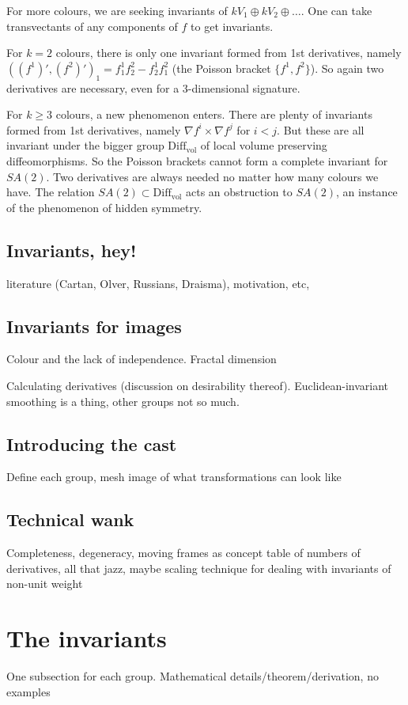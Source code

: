 \documentclass{article}
\begin{document}
For more colours,  we are seeking invariants of $k V_1 \oplus k V_2 \oplus \dots$. One can take transvectants of any components of $f$ to get invariants.

For $k=2$ colours, there is only one  invariant formed from 1st derivatives, namely $((f^1)',(f^2)')_1 = f^1_1 f^2_2 - f^1_2 f^2_1$ (the Poisson bracket $\{f^1,f^2\}$). So again two derivatives are necessary, even for 
a 3-dimensional signature.

 For $k\ge 3$ colours, a new phenomenon enters.  There are plenty of invariants
formed from 1st derivatives, namely $\nabla f^i \times \nabla f^j$ for $i<j$. But these are all invariant under the bigger group $\mathrm{Diff}_{\mathrm{vol}}$ of local volume preserving diffeomorphisms. So the Poisson brackets
cannot form a complete invariant for $SA(2)$. Two derivatives are always needed no matter how many
colours we have. The relation $SA(2)\subset \mathrm{Diff}_{\mathrm{vol}}$ acts an obstruction
to $SA(2)$, an instance of the phenomenon of hidden symmetry.


\subsection{Invariants, hey!}
literature (Cartan, Olver, Russians, Draisma), motivation, etc,

\subsection{Invariants for images}
Colour and the lack of independence. Fractal dimension 

Calculating derivatives (discussion on desirability thereof).
Euclidean-invariant smoothing is a thing, other groups not so much.

\subsection{Introducing the cast}
Define each group, mesh image of what transformations can look like

\subsection{Technical wank}
Completeness, degeneracy, moving frames as concept table of numbers of
derivatives, all that jazz, maybe scaling technique
for dealing with invariants of non-unit weight


\section{The invariants}
One subsection for each group. Mathematical details/theorem/derivation, no
examples
\end{document}
